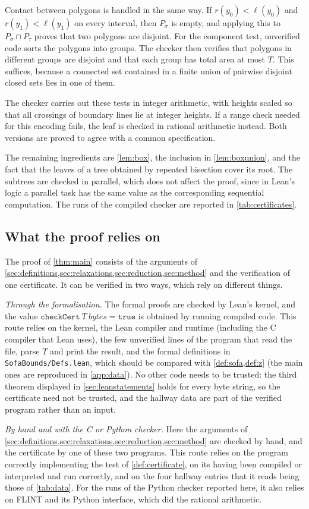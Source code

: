 Contact between polygons is handled in the same way. If $r(y_0)<\ell(y_0)$ and $r(y_1)<\ell(y_1)$ on every interval, then $P_\sigma$ is empty, and applying this to $P_\sigma\cap P_\tau$ proves that two polygons are disjoint. For the component test, unverified code sorts the polygons into groups. The checker then verifies that polygons in different groups are disjoint and that each group has total area at most $T$. This suffices, because a connected set contained in a finite union of pairwise disjoint closed sets lies in one of them.

The checker carries out these tests in integer arithmetic, with heights scaled so that all crossings of boundary lines lie at integer heights. If a range check needed for this encoding fails, the leaf is checked in rational arithmetic instead. Both versions are proved to agree with a common specification.

The remaining ingredients are \cref{lem:box}, the inclusion in \cref{lem:boxunion}, and the fact that the leaves of a tree obtained by repeated bisection cover its root. The subtrees are checked in parallel, which does not affect the proof, since in Lean's logic a parallel task has the same value as the corresponding sequential computation. The runs of the compiled checker are reported in \cref{tab:certificates}.

\subsection{What the proof relies on}\label{sec:trust}

The proof of \cref{thm:main} consists of the arguments of \cref{sec:definitions,sec:relaxations,sec:reduction,sec:method} and the verification of one certificate. It can be verified in two ways, which rely on different things.

\emph{Through the formalisation.} The formal proofs are checked by Lean's kernel, and the value $\mathtt{checkCert}\ T\ \mathit{bytes}=\mathtt{true}$ is obtained by running compiled code. This route relies on the kernel, the Lean compiler and runtime (including the C compiler that Lean uses), the few unverified lines of the program that read the file, parse $T$ and print the result, and the formal definitions in \texttt{SofaBounds/Defs.lean}, which should be compared with \cref{def:sofa,def:z} (the main ones are reproduced in \cref{app:data}). No other code needs to be trusted: the third theorem displayed in \cref{sec:leanstatements} holds for every byte string, so the certificate need not be trusted, and the hallway data are part of the verified program rather than an input.

\emph{By hand and with the C or Python checker.} Here the arguments of \cref{sec:definitions,sec:relaxations,sec:reduction,sec:method} are checked by hand, and the certificate by one of these two programs. This route relies on the program correctly implementing the test of \cref{def:certificate}, on its having been compiled or interpreted and run correctly, and on the four hallway entries that it reads being those of \cref{tab:data}. For the runs of the Python checker reported here, it also relies on FLINT and its Python interface, which did the rational arithmetic.

